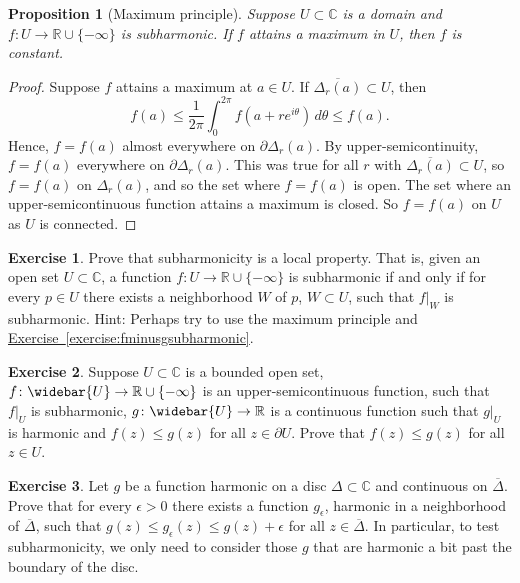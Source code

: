 \documentclass[12pt,openany]{book}
\newcommand{\C}{{\mathbb{C}}}
\newcommand{\R}{{\mathbb{R}}}
\theoremstyle{plain}
\newtheorem{prop}[thm]{Proposition}
\theoremstyle{remark}
\theoremstyle{definition}
\newenvironment{exbox}{%
    \def\FrameCommand{\vrule width 1pt \relax\hspace{10pt}}%
    \MakeFramed{\advance\hsize-\width\FrameRestore}%
}{%
    \endMakeFramed
}
\theoremstyle{exercise}
\newtheorem{exercise}{Exercise}[section]
\theoremstyle{example}
\newcommand{\exerciseref}[1]{\hyperref[#1]{Exercise~\ref*{#1}}}
\begin{document}
\begin{prop}[Maximum principle]
Suppose $U \subset \C$ is a domain and $f \colon U \to \R \cup \{ -\infty \}$
is subharmonic.  If $f$ attains a maximum in $U$, then $f$ is constant.
\end{prop}

\begin{proof}
Suppose $f$ attains a maximum at $a \in U$.
If
$\overline{\Delta_r(a)} \subset U$, then
\begin{equation*}
f(a) \leq \frac{1}{2\pi} \int_0^{2\pi} f(a+re^{i\theta})\, d\theta \leq f(a)
.
\end{equation*}
Hence, $f = f(a)$ almost everywhere on $\partial \Delta_r(a)$.
By upper-semicontinuity, $f = f(a)$ everywhere on $\partial \Delta_r(a)$.
This was true for all $r$
with $\overline{\Delta_r(a)} \subset U$, so $f=f(a)$ on $\Delta_r(a)$,
and so the set where $f=f(a)$ is open.  The set where an upper-semicontinuous
function attains a maximum is closed.  So $f=f(a)$ on $U$ as $U$ is
connected.
\end{proof}

\begin{exbox}
\begin{exercise}
Prove that subharmonicity is a local property.  That is, given an open set
$U \subset \C$, a function $f \colon U \to \R \cup \{ -\infty \}$ is subharmonic if
and only if for every $p \in U$ there exists a neighborhood $W$ of $p$,
$W \subset U$, such that $f|_{W}$ is subharmonic.  Hint: Perhaps try to use
the maximum principle and \exerciseref{exercise:fminusgsubharmonic}.
\end{exercise}

\begin{exercise}
Suppose $U \subset \C$ is a bounded open set, $f \colon \widebar{U} \to \R
\cup \{-\infty\}$ is an upper-semicontinuous function, such that $f|_U$
is subharmonic, $g \colon \widebar{U} \to \R$ is a continuous function
such that $g|_U$ is harmonic and
$f(z) \leq g(z)$ for all $z \in \partial U$.  Prove that
$f(z) \leq g(z)$ for all $z \in U$.
\end{exercise}

\begin{exercise} \label{exercise:onlyniceuneededforsubharmonic}
Let $g$ be a function
harmonic on a disc $\Delta \subset \C$ and continuous on
$\overline{\Delta}$.  Prove that for every $\epsilon > 0$ there exists
a function $g_\epsilon$, harmonic in a neighborhood of $\overline{\Delta}$,
such that $g(z) \leq g_\epsilon(z) \leq g(z)+\epsilon$ for all $z \in
\overline{\Delta}$.
In particular, to test subharmonicity, we only need to consider those
$g$ that are harmonic a bit past the boundary of the disc.
\end{exercise}
\end{exbox}
\end{document}
